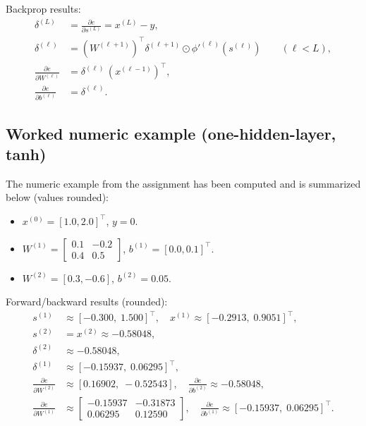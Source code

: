 \documentclass[12pt]{article}
\begin{document}
Backprop results:
\begin{align*}
\delta^{(L)} &= \frac{\partial e}{\partial s^{(L)}} = x^{(L)} - y,\\
\delta^{(\ell)} &= (W^{(\ell+1)})^\top \delta^{(\ell+1)} \odot \phi'^{(\ell)}(s^{(\ell)}) \qquad (\ell < L),\\
\frac{\partial e}{\partial W^{(\ell)}} &= \delta^{(\ell)}\,(x^{(\ell-1)})^\top,\\
\frac{\partial e}{\partial b^{(\ell)}} &= \delta^{(\ell)}.
\end{align*}

\subsection*{Worked numeric example (one-hidden-layer, tanh)}
The numeric example from the assignment has been computed and is summarized below (values rounded):
\begin{itemize}
  \item $x^{(0)}=[1.0,2.0]^\top$, $y=0$.
  \item $W^{(1)}=\begin{bmatrix}0.1 & -0.2\\0.4 & 0.5\end{bmatrix}$, $b^{(1)}=[0.0,0.1]^\top$.
  \item $W^{(2)}=[0.3, -0.6]$, $b^{(2)}=0.05$.
\end{itemize}
Forward/backward results (rounded):
\begin{align*}
s^{(1)} &\approx [-0.300,\;1.500]^\top,\quad x^{(1)} \approx [-0.2913,\;0.9051]^\top,\\
s^{(2)} &= x^{(2)} \approx -0.58048,\\
\delta^{(2)} &\approx -0.58048,\\
\delta^{(1)} &\approx [-0.15937,\;0.06295]^\top,\\
\frac{\partial e}{\partial W^{(2)}} &\approx [0.16902,\;-0.52543],\quad \frac{\partial e}{\partial b^{(2)}}\approx -0.58048,\\
\frac{\partial e}{\partial W^{(1)}} &\approx \begin{bmatrix}-0.15937 & -0.31873\\[3pt]0.06295 & 0.12590\end{bmatrix},\quad
\frac{\partial e}{\partial b^{(1)}}\approx [-0.15937,\;0.06295]^\top.
\end{align*}

\end{document}
